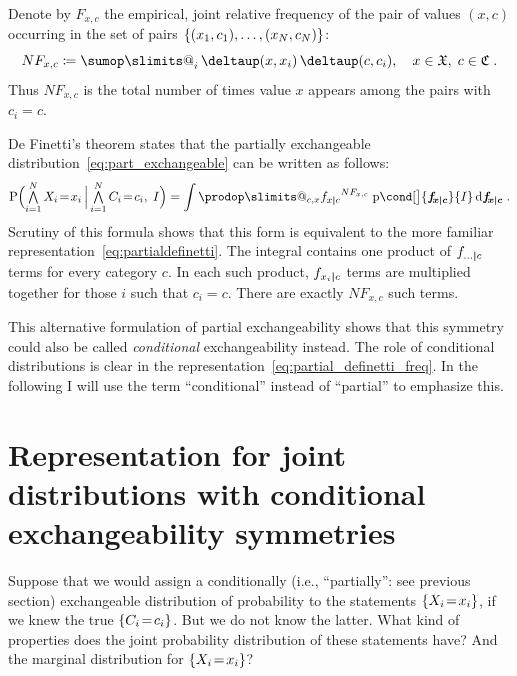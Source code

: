 \documentclass[\ifafour a4paper,12pt,\else a5paper,10pt,\fi%
onecolumn,oneside,article,%
british%
]{memoir}
\makeatletter
\theoremstyle{remark}
\theoremstyle{innote}
\def\sum{\DOTSI\sumop\slimits@}
\def\prod{\DOTSI\prodop\slimits@}
\newcommand*{\delt}{\deltaup}%
\newcommand*{\di}{\mathrm{d}}%
\newcommand*{\defd}{\coloneqq}
\newcommand*{\Land}{\mathop{\textstyle\bigwedge}}
\DeclarePairedDelimiter\set{\{}{\}}
\newcommand*{\pf}{\mathrm{p}}%
\newcommand*{\p}{\mathrm{P}}%
\renewcommand*{\|}[1][]{\nonscript\,#1\vert\nonscript\,\mathopen{}}
\newcommand*{\ie}{{i.e.}}
\newcommand*{\tsum}{\mathop{\textstyle\sum}\nolimits}
\renewcommand*{\=}{\TextOrMath\texteq\eq}
\newcommand*{\X}[1]{X_{#1}}
\newcommand*{\x}[1]{x_{#1}}
\newcommand*{\C}[1]{C_{#1}}
\newcommand*{\cc}[1]{c_{#1}}
\newcommand*{\sX}{\mathfrak{X}}
\newcommand*{\sC}{\mathfrak{C}}
\newcommand*{\fxc}{\bm{f_{\!x\bcond c}}}
\newcommand*{\bcond}[1][]{\nonscript\,#1\bm{\vert}\nonscript\;\mathopen{}}
\makeatother
\begin{document}
Denote by $F_{x,c}$ the empirical, joint relative frequency of the pair of
values $(x,c)$ occurring in the set of pairs
$\set{(\x{1}, \cc{1}), \dotsc, (\x{N}, \cc{N})}$:
\begin{equation}
  \label{eq:rel_frequencies}
  N F_{x,c} \defd \tsum_{i}\delt(x, \x{i})\,\delt(c, \cc{i}),
  \quad x \in \sX,\; c \in \sC \;.
\end{equation}
Thus $N F_{x,c}$ is the total number of times value $x$ appears among the
pairs with $\cc{i}=c$.

De Finetti’s theorem states that the partially exchangeable
distribution~\eqref{eq:part_exchangeable} can be written as follows:
\begin{equation}
  \label{eq:partial_definetti_freq}
    \p\Bigl(\Land_{i=1}^{N} \X{i}\=\x{i} \|[\Big]
    \Land_{i=1}^{N}\C{i}\=\cc{i},\;  I\Bigr) =
\int\prod_{c,x} {f_{x \bcond c}}^{N F_{x, c}}\;
\pf\cond[\big]{\fxc}{I} \,\di\fxc \;.
\end{equation}
Scrutiny of this formula shows that this form is equivalent to the more
familiar representation~\eqref{eq:partialdefinetti}. The integral contains
one product of $f_{\dotso \bcond c}$ terms for every category $c$. In each
such product, $f_{\x{i} \bcond c}$ terms are multiplied together for those
$i$ such that $\cc{i}=c$. There are exactly $N F_{x,c}$ such terms.

This alternative formulation of partial exchangeability shows that this
symmetry could also be called \emph{conditional} exchangeability instead.
The role of conditional distributions is clear in the
representation~\eqref{eq:partial_definetti_freq}. In the following I will
use the term \enquote{conditional} instead of \enquote{partial} to
emphasize this.


\section{Representation for joint distributions with conditional
exchangeability  symmetries}
\label{sec:result}

Suppose that we would assign a conditionally (\ie, \enquote{partially}: see
previous section) exchangeable distribution of probability to the
statements $\set{\X{i}\=\x{i}}$, if we knew the true $\set{\C{i}\=\cc{i}}$.
But we do not know the latter. What kind of properties does the joint
probability distribution of these statements have? And the marginal
distribution for $\set{\X{i}\=\x{i}}$?
\end{document}

